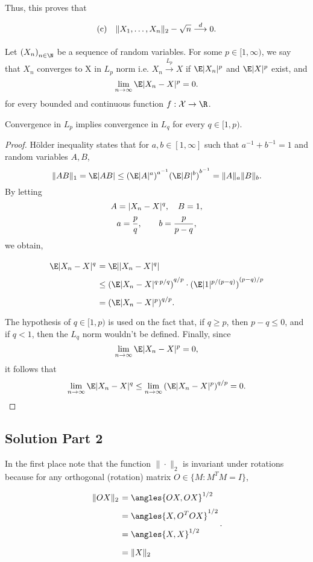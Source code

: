 Thus, this proves that
\[ \everymath{\displaystyle}
\begin{array}{cc}
    \text{(c)} & \|X_1, \ldots, X_n\|_2-\sqrt{n} \overset{d}{\longrightarrow} 0.
\end{array} \]

\begin{definition}[Convergence in $L_p$]
    Let ${(X_n)}_{n\in \N}$ be a sequence of random variables. For some $p \in [1,\infty)$, we say that $X_n$ converges to X in $L_p$ norm i.e. $X_n \overset{L_p}{\to} X$ if $\E |X_n|^p$ and $\E |X|^p$ exist, and
    \[ \lim_{n\to\infty} \E |X_n - X|^p = 0.\]
    for every bounded and continuous function $f : \mathcal{X}\to \R$.
\end{definition}

\begin{theorem}[Exercise 1.d.]
Convergence in $L_p$ implies convergence in $L_q$ for every $q\in [1,p)$.
\end{theorem}
\begin{proof}
Hölder inequality states that for $a,b \in [1,\infty]$ such that $a^{-1} + b^{-1} = 1$ and random variables $A, B$,
\[ \|AB\|_1 = \E |AB| \leq {(\E |A|^a)}^{a^{-1}} {(\E |B|^b)}^{b^{-1}} = \|A\|_a \|B\|_b.\] 
By letting
\[ A = |X_n - X|^q,\hspace*{1em} B = 1, \]
\[ a = \frac{p}{q},\hspace*{2em} b = \frac{p}{p-q}, \]
we obtain,
\[ \everymath{\displaystyle}
\arraycolsep=1.8pt\def\arraystretch{1.8}
\begin{array}{rl}
    \E |X_n - X|^q & = \E||X_n - X|^q|\\
     & \leq {(\E |X_n - X|^{q\cdot p/q})}^{q/p} \cdot {(\E |1|^{p/(p-q)})}^{(p-q)/p}\\
     & = {(\E |X_n - X|^{p})}^{q/p}.
\end{array} \] 
The hypothesis of $q \in [1,p)$ is used on the fact that, if $q \geq p$, then $p-q \leq 0$, and if $ q < 1 $, then the $L_q$ norm wouldn't be defined.
Finally, since
\[ \lim_{n\to\infty} \E |X_n - X|^p = 0,\]
it follows that
\[ \lim_{n\to\infty} \E |X_n - X|^q \leq \lim_{n\to\infty} {(\E |X_n - X|^p)}^{q/p} = 0. \]
\end{proof}

\subsection*{Solution Part 2}

In the first place note that the function $\|\cdot\|_2$ is invariant under rotations because for any orthogonal (rotation) matrix $O \in \{M : M^T M = I\}$,
\[ \everymath{\displaystyle}
\arraycolsep=1.8pt\def\arraystretch{1.8}
\begin{array}{rl}
    \|OX\|_2 & = \angles{OX, OX}^{1/2}\\
    & = \angles{X, O^T OX}^{1/2}\\
    & = \angles{X,X}^{1/2}\\
    & = \|X\|_2
\end{array} . \]

